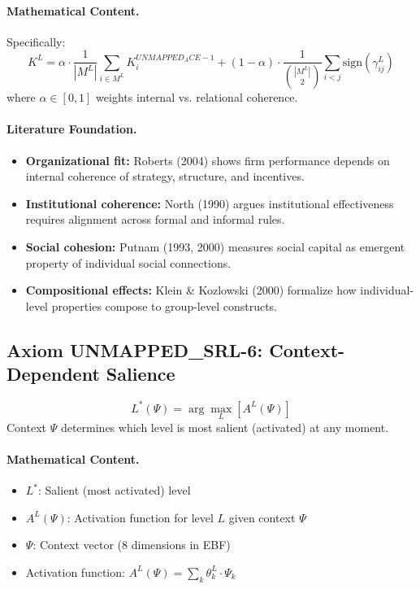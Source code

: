 \paragraph{Mathematical Content.}
Specifically:
\begin{equation}
K^L = \alpha \cdot \frac{1}{|M^L|} \sum_{i \in M^L} K^{UNMAPPED_ACE-1}_i + (1-\alpha) \cdot \frac{1}{\binom{|M^L|}{2}} \sum_{i < j} \text{sign}(\gamma^L_{ij})
\end{equation}
where $\alpha \in [0,1]$ weights internal vs. relational coherence.

\paragraph{Literature Foundation.}
\begin{itemize}
\item \textbf{Organizational fit:} Roberts (2004) shows firm performance depends 
on internal coherence of strategy, structure, and incentives.
\item \textbf{Institutional coherence:} North (1990) argues institutional 
effectiveness requires alignment across formal and informal rules.
\item \textbf{Social cohesion:} Putnam (1993, 2000) measures social capital 
as emergent property of individual social connections.
\item \textbf{Compositional effects:} Klein \& Kozlowski (2000) formalize how 
individual-level properties compose to group-level constructs.
\end{itemize}

\subsection{Axiom UNMAPPED_SRL-6: Context-Dependent Salience}

\begin{tcolorbox}[colback=gray!5!white, colframe=gray!75!black, title=Axiom UNMAPPED_SRL-6: Context Salience]
\begin{equation}
\boxed{
L^*(\Psi) = \arg\max_L \left[ A^L(\Psi) \right]
}
\end{equation}
Context $\Psi$ determines which level is most salient (activated) at any moment.
\end{tcolorbox}

\paragraph{Mathematical Content.}
\begin{itemize}
\item $L^*$: Salient (most activated) level
\item $A^L(\Psi)$: Activation function for level $L$ given context $\Psi$
\item $\Psi$: Context vector (8 dimensions in EBF)
\item Activation function: $A^L(\Psi) = \sum_k \theta^L_k \cdot \Psi_k$
\end{itemize}

